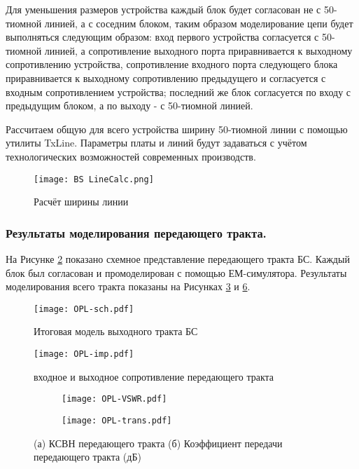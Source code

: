 Для уменьшения размеров устройства каждый блок будет согласован не с 50-тиомной линией, а с соседним блоком, таким образом моделирование цепи будет выполняться следующим образом: вход первого устройства согласуется с 50-тиомной линией, а сопротивление выходного порта приравнивается к выходному сопротивлению устройства, сопротивление входного порта следующего блока приравнивается к выходному сопротивлению предыдущего и согласуется с входным сопротивлением устройства; последний же блок согласуется по входу с предыдущим блоком, а по выходу - с 50-тиомной линией.

Рассчитаем общую для всего устройства ширину 50-тиомной линии с помощью утилиты TxLine. Параметры платы и линий будут задаваться с учётом технологических возможностей современных производств.

\begin{figure}[H]
	\centering
	\texttt{[image: BS LineCalc.png]}
	\caption{Расчёт ширины линии}%
	\label{fig:BS LineCalc}
\end{figure}

\subsubsection{Результаты моделирования передающего тракта.}
На Рисунке \ref{fig:OPL-sch} показано схемное представление передающего тракта БС. Каждый блок был согласован и промоделирован с помощью ЕМ-симулятора. Результаты моделирования всего тракта показаны на Рисунках \ref{fig:OPL-imp} и \ref{fig:OPL-VSWR-trans}.

\begin{figure}[H]
	\centering
	\texttt{[image: OPL-sch.pdf]}
	\caption{Итоговая модель выходного тракта БС}%
	\label{fig:OPL-sch}
\end{figure}

\begin{figure}[H]
	\centering
	\texttt{[image: OPL-imp.pdf]}
	\caption{входное и выходное сопротивление передающего тракта}%
	\label{fig:OPL-imp}
\end{figure}

\begin{figure}[H]
	\centering
	\begin{subfigure}[b]{0.49\textwidth}
		\centering
		\texttt{[image: OPL-VSWR.pdf]}
		\caption{}%
		\label{fig:OPL-VSWR}
	\end{subfigure}
	\hfill
	\begin{subfigure}[b]{0.49\textwidth}
		\centering
		\texttt{[image: OPL-trans.pdf]}
		\caption{}%
		\label{fig:OPL-trans}
	\end{subfigure}
	\caption{%
		(а) КСВН передающего тракта
		(б) Коэффициент передачи передающего тракта (дБ)
	}%
	\label{fig:OPL-VSWR-trans}
\end{figure}

